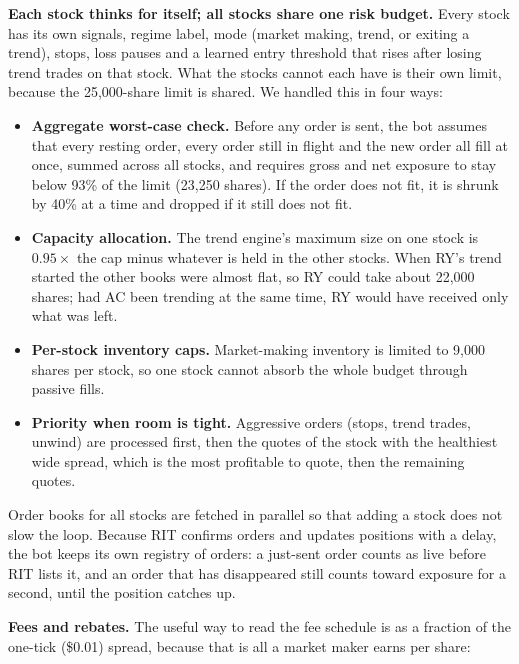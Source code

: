 \documentclass[10pt]{article}
\begin{document}
\textbf{Each stock thinks for itself; all stocks share one risk budget.} Every stock has its own signals, regime label, mode (market making, trend, or exiting a trend),
stops, loss pauses and a learned entry threshold that rises after losing trend trades on that stock. What the stocks cannot each have is their own limit, because the
25{,}000-share limit is shared. We handled this in four ways:
\begin{itemize}
  \item \textbf{Aggregate worst-case check.} Before any order is sent, the bot assumes that every resting order, every order still in flight and the new order all fill at once,
        summed across all stocks, and requires gross and net exposure to stay below 93\% of the limit (23{,}250 shares). If the order does not fit, it is shrunk by 40\% at a time
        and dropped if it still does not fit.
  \item \textbf{Capacity allocation.} The trend engine's maximum size on one stock is $0.95\times$ the cap minus whatever is held in the other stocks. When RY's trend started the
        other books were almost flat, so RY could take about 22{,}000 shares; had AC been trending at the same time, RY would have received only what was left.
  \item \textbf{Per-stock inventory caps.} Market-making inventory is limited to 9{,}000 shares per stock, so one stock cannot absorb the whole budget through passive fills.
  \item \textbf{Priority when room is tight.} Aggressive orders (stops, trend trades, unwind) are processed first, then the quotes of the stock with the healthiest wide spread,
        which is the most profitable to quote, then the remaining quotes.
\end{itemize}
Order books for all stocks are fetched in parallel so that adding a stock does not slow the loop. Because RIT confirms orders and updates positions with a delay, the bot keeps its own
registry of orders: a just-sent order counts as live before RIT lists it, and an order that has disappeared still counts toward exposure for a second, until the position catches up.

\textbf{Fees and rebates.} The useful way to read the fee schedule is as a fraction of the one-tick (\$0.01) spread, because that is all a market maker earns per share:
\end{document}
